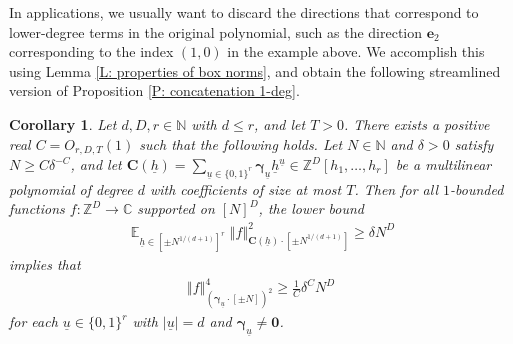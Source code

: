 \documentclass[11pt]{amsart}
\newtheorem{corollary}[lemma]{Corollary}
\theoremstyle{definition}
\DeclareMathOperator*{\E}{\mathbb{E}}
\newcommand{\C}{{\mathbb C}}
\newcommand{\N}{{\mathbb N}}
\newcommand{\Z}{{\mathbb Z}}
\newcommand{\bc}{{\mathbf{C}}}
\newcommand{\be}{{\mathbf{e}}}
\newcommand{\bgamma}{{\boldsymbol{\gamma}}}
\newcommand{\uh}{{\underline{h}}}
\newcommand{\uu}{{\underline{u}}}
\newcommand{\norm}[1]{\left\Vert #1\right\Vert}
\begin{document}
In applications, we usually want to discard the directions that correspond to lower-degree terms in the original polynomial, such as the direction $\be_2$ corresponding to the index $(1,0)$ in the example above. We accomplish this using Lemma \ref{L: properties of box norms}, and obtain the following streamlined version of Proposition \ref{P: concatenation 1-deg}.
\begin{corollary}\label{C: concatenation 1-deg}
   Let $d, D, r\in\N$ with $d\leq r$, and let $T>0$. There exists %
   a positive real $C=O_{r,D,T}(1)$ such that the following holds. Let $N\in\N$ and $\delta>0$ satisfy $N \geq C \delta^{-C}$, and let $\bc(\uh)= \sum\limits_{\uu\in\{0,1\}^r}\bgamma_\uu \uh^\uu\in\Z^D[h_1, \ldots, h_{r}]$ be a multilinear polynomial of degree $d$ with coefficients of size at most $T$.  Then for all $1$-bounded functions $f:\Z^D\to\C$ supported on $[N]^D$, the lower bound 
   \begin{align*}
        \E_{\uh\in[\pm N^{1/(d+1)}]^r}\norm{f}_{\bc(\uh)\cdot[\pm N^{1/(d+1)}]}^2\geq \delta N^D
   \end{align*}
   implies that
    \begin{align*}
        \norm{f}_{(\bgamma_\uu\cdot[\pm N])^2}^4\geq \frac{1}{C}\delta^{C}N^D
    \end{align*}
    for each $\uu\in\{0,1\}^r$ with $|\uu| = d$ {and $\bgamma_\uu \neq \textbf{0}$}.
\end{corollary}
\end{document}
